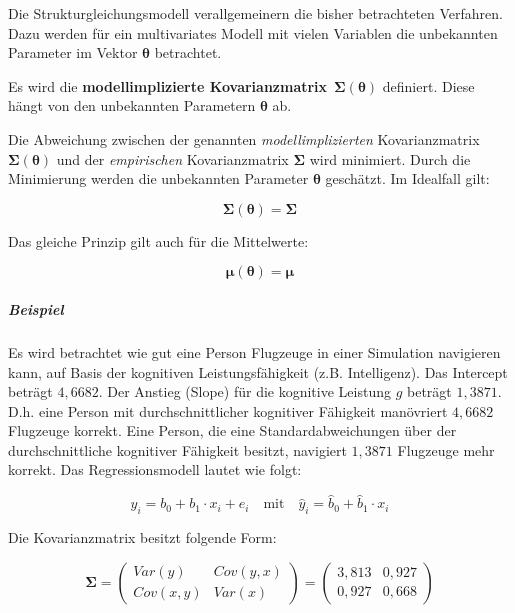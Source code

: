 \documentclass{article}
\numberwithin{equation}{section}
\begin{document}
Die Strukturgleichungsmodell verallgemeinern die bisher betrachteten Verfahren. Dazu werden für ein multivariates Modell mit vielen Variablen die unbekannten Parameter im Vektor $\boldsymbol\theta$ betrachtet.

Es wird die \textbf{modellimplizierte Kovarianzmatrix}~$\boldsymbol{\Sigma(\theta)}$ definiert. Diese hängt von den unbekannten Parametern $\boldsymbol\theta$ ab.

Die Abweichung zwischen der genannten \emph{modellimplizierten} Kovarianzmatrix $\boldsymbol{\Sigma(\theta)}$ und der \emph{empirischen} Kovarianzmatrix $\boldsymbol\Sigma$ wird minimiert. Durch die Minimierung werden die unbekannten Parameter $\boldsymbol\theta$ geschätzt. Im Idealfall gilt:

\begin{equation}
\boldsymbol{\Sigma(\theta)} = \boldsymbol\Sigma
\end{equation}

Das gleiche Prinzip gilt auch für die Mittelwerte:

\begin{equation}
\boldsymbol{\mu(\theta)} = \boldsymbol\mu
\end{equation}

\subparagraph{Beispiel}

Es wird betrachtet wie gut eine Person Flugzeuge in einer Simulation navigieren kann, auf Basis der kognitiven Leistungsfähigkeit (z.B. Intelligenz). Das Intercept beträgt $4,6682$. Der Anstieg (Slope) für die kognitive Leistung $g$ beträgt $1,3871$. D.h. eine Person mit durchschnittlicher kognitiver Fähigkeit manövriert $4,6682$ Flugzeuge korrekt. Eine Person, die eine Standardabweichungen über der durchschnittliche kognitiver Fähigkeit besitzt, navigiert $1,3871$ Flugzeuge mehr korrekt. Das Regressionsmodell lautet wie folgt:

\begin{equation}
y_i = b_0 + b_1 \cdot x_i + e_i \quad \text{mit}\quad \hat y_i = \hat b_0 + \hat b_1 \cdot x_i
\end{equation}

Die Kovarianzmatrix besitzt folgende Form:

\begin{equation}
\boldsymbol\Sigma
= \begin{pmatrix}
Var(y) & Cov(y,x)\\
Cov(x,y) & Var(x)
\end{pmatrix}
= \begin{pmatrix}
3,813 & 0,927\\
0,927 & 0,668
\end{pmatrix}
\end{equation}
\end{document}

